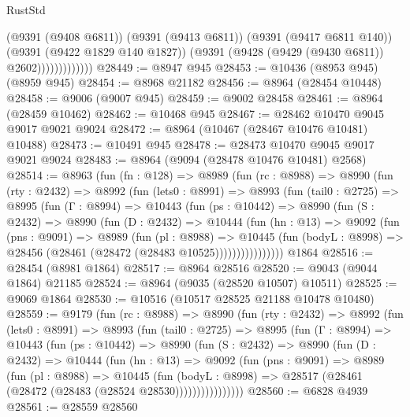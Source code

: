 \begin{lexlean}{RustStd}
\begin{coremodule}
                          (@9391 (@9408 @6811))
                          (@9391 (@9413 @6811))
                          (@9391 (@9417 @6811 @140))
                          (@9391 (@9422 @1829 @140 @1827))
                          (@9391 (@9428 (@9429 (@9430 @6811)) @2602)))))))))))))
@28449 := @8947 @945
@28453 := @10436 (@8953 @945) (@8959 @945)
@28454 := @8968 @21182
@28456 := @8964 (@28454 @10448)
@28458 := @9006 (@9007 @945)
@28459 := @9002 @28458
@28461 := @8964 (@28459 @10462)
@28462 := @10468 @945
@28467 := @28462 @10470 @9045 @9017 @9021 @9024
@28472 := @8964 (@10467 (@28467 @10476 @10481) @10488)
@28473 := @10491 @945
@28478 := @28473 @10470 @9045 @9017 @9021 @9024
@28483 := @8964 (@9094 (@28478 @10476 @10481) @2568)
@28514 := @8963
    (fun (fn : @128) =>
    @8989
      (fun (rc : @8988) =>
      @8990
        (fun (rty : @2432) =>
        @8992
          (fun (lets0 : @8991) =>
          @8993
            (fun (tail0 : @2725) =>
            @8995
              (fun (Γ : @8994) =>
              @10443
                (fun (ps : @10442) =>
                @8990
                  (fun (S : @2432) =>
                  @8990
                    (fun (D : @2432) =>
                    @10444
                      (fun (hn : @13) =>
                      @9092
                        (fun (pns : @9091) =>
                        @8989
                          (fun (pl : @8988) =>
                          @10445
                            (fun (bodyL : @8998) =>
                            @28456 (@28461 (@28472 (@28483 @10525))))))))))))))))
    @1864
@28516 := @28454 (@8981 @1864)
@28517 := @8964 @28516
@28520 := @9043 (@9044 @1864) @21185
@28524 := @8964 (@9035 (@28520 @10507) @10511)
@28525 := @9069 @1864
@28530 := @10516 (@10517 @28525 @21188 @10478 @10480)
@28559 := @9179
    (fun (rc : @8988) =>
    @8990
      (fun (rty : @2432) =>
      @8992
        (fun (lets0 : @8991) =>
        @8993
          (fun (tail0 : @2725) =>
          @8995
            (fun (Γ : @8994) =>
            @10443
              (fun (ps : @10442) =>
              @8990
                (fun (S : @2432) =>
                @8990
                  (fun (D : @2432) =>
                  @10444
                    (fun (hn : @13) =>
                    @9092
                      (fun (pns : @9091) =>
                      @8989
                        (fun (pl : @8988) =>
                        @10445
                          (fun (bodyL : @8998) =>
                          @28517 (@28461 (@28472 (@28483 (@28524 @28530))))))))))))))))
@28560 := @6828 @4939
@28561 := @28559 @28560

\end{coremodule}
\end{lexlean}
